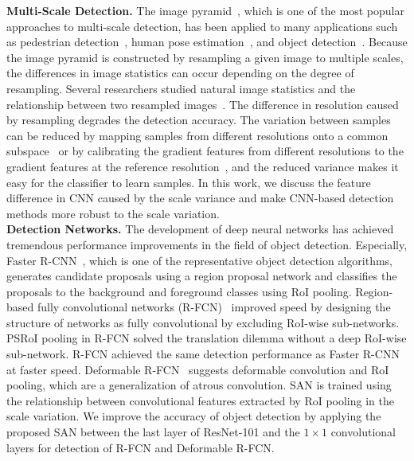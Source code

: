 \documentclass[runningheads]{llncs}
\begin{document}
\noindent
\textbf{Multi-Scale Detection.}
The image pyramid~\cite{adelson1984pyramid,gonzalez2009digital}, which is one of the most popular approaches to multi-scale detection, has been applied to many applications such as pedestrian detection~\cite{dalal2005histograms,ding2012contextual,dollar2014fast,dollar2009integral}, human pose estimation~\cite{yang2013articulated}, and object detection~\cite{felzenszwalb2010object}.
Because the image pyramid is constructed by resampling a given image to multiple scales, the differences in image statistics can occur depending on the degree of resampling.
Several researchers studied natural image statistics and the relationship between two resampled images~\cite{field1987relations,ruderman1994statistics,ruderman1994statistics1}.
The difference in resolution caused by resampling degrades the detection accuracy.
The variation between samples can be reduced by mapping samples from different resolutions onto a common subspace~\cite{yan2013robust} or by calibrating the gradient features from different resolutions to the gradient features at the reference resolution~\cite{detector2017icip}, and the reduced variance makes  it easy for the classifier to learn samples.
In this work, we discuss the feature difference in CNN caused by the scale variance and make CNN-based detection methods more robust to the scale variation.
\\

\noindent
\textbf{Detection Networks.}
The development of deep neural networks has achieved tremendous performance improvements in the field of object detection.
Especially, Faster R-CNN~\cite{ren2015faster}, which is one of the representative object detection algorithms,
generates candidate proposals using a region proposal network and classifies the proposals to the background and foreground classes using RoI pooling.
Region-based fully convolutional networks (R-FCN)~\cite{li2016r} improved speed by designing the structure of networks as fully convolutional by excluding RoI-wise sub-networks.
PSRoI pooling in R-FCN solved the translation dilemma without a deep RoI-wise sub-network.
R-FCN achieved the same detection performance as Faster R-CNN at faster speed.
Deformable R-FCN~\cite{dai17dcn} suggests deformable convolution and RoI pooling, which are a generalization of atrous convolution.
SAN is trained using the relationship between convolutional features extracted by RoI pooling in the scale variation.
We improve the accuracy of object detection by applying the proposed SAN between the last layer of ResNet-101 and the $1\times1$ convolutional layers for detection of R-FCN and Deformable R-FCN.
\end{document}
